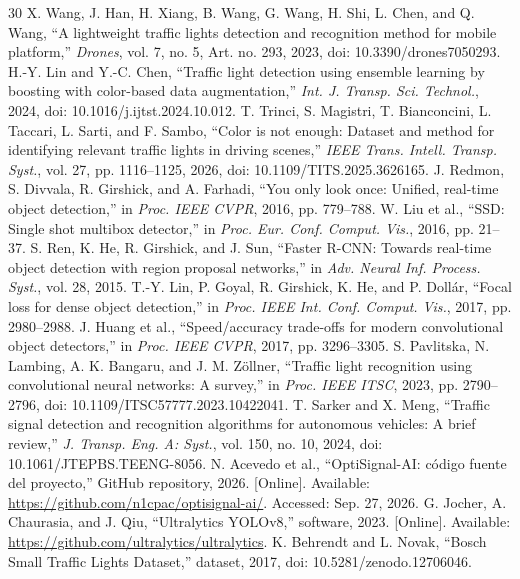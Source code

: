 \documentclass[conference]{IEEEtran}
\begin{document}
\begin{thebibliography}{30}
 X. Wang, J. Han, H. Xiang, B. Wang, G. Wang, H. Shi, L. Chen, and Q. Wang, ``A lightweight traffic lights detection and recognition method for mobile platform,'' \emph{Drones}, vol. 7, no. 5, Art. no. 293, 2023, doi: 10.3390/drones7050293.
 H.-Y. Lin and Y.-C. Chen, ``Traffic light detection using ensemble learning by boosting with color-based data augmentation,'' \emph{Int. J. Transp. Sci. Technol.}, 2024, doi: 10.1016/j.ijtst.2024.10.012.
 T. Trinci, S. Magistri, T. Bianconcini, L. Taccari, L. Sarti, and F. Sambo, ``Color is not enough: Dataset and method for identifying relevant traffic lights in driving scenes,'' \emph{IEEE Trans. Intell. Transp. Syst.}, vol. 27, pp. 1116--1125, 2026, doi: 10.1109/TITS.2025.3626165.
 J. Redmon, S. Divvala, R. Girshick, and A. Farhadi, ``You only look once: Unified, real-time object detection,'' in \emph{Proc. IEEE CVPR}, 2016, pp. 779--788.
 W. Liu et al., ``SSD: Single shot multibox detector,'' in \emph{Proc. Eur. Conf. Comput. Vis.}, 2016, pp. 21--37.
 S. Ren, K. He, R. Girshick, and J. Sun, ``Faster R-CNN: Towards real-time object detection with region proposal networks,'' in \emph{Adv. Neural Inf. Process. Syst.}, vol. 28, 2015.
 T.-Y. Lin, P. Goyal, R. Girshick, K. He, and P. Doll\'ar, ``Focal loss for dense object detection,'' in \emph{Proc. IEEE Int. Conf. Comput. Vis.}, 2017, pp. 2980--2988.
 J. Huang et al., ``Speed/accuracy trade-offs for modern convolutional object detectors,'' in \emph{Proc. IEEE CVPR}, 2017, pp. 3296--3305.
 S. Pavlitska, N. Lambing, A. K. Bangaru, and J. M. Z\"ollner, ``Traffic light recognition using convolutional neural networks: A survey,'' in \emph{Proc. IEEE ITSC}, 2023, pp. 2790--2796, doi: 10.1109/ITSC57777.2023.10422041.
 T. Sarker and X. Meng, ``Traffic signal detection and recognition algorithms for autonomous vehicles: A brief review,'' \emph{J. Transp. Eng. A: Syst.}, vol. 150, no. 10, 2024, doi: 10.1061/JTEPBS.TEENG-8056.
 N. Acevedo et al., ``OptiSignal-AI: código fuente del proyecto,'' GitHub repository, 2026. [Online]. Available: \url{https://github.com/n1cpac/optisignal-ai/}. Accessed: Sep. 27, 2026.
 G. Jocher, A. Chaurasia, and J. Qiu, ``Ultralytics YOLOv8,'' software, 2023. [Online]. Available: \url{https://github.com/ultralytics/ultralytics}.
 K. Behrendt and L. Novak, ``Bosch Small Traffic Lights Dataset,'' dataset, 2017, doi: 10.5281/zenodo.12706046.
\end{thebibliography}
\end{document}
